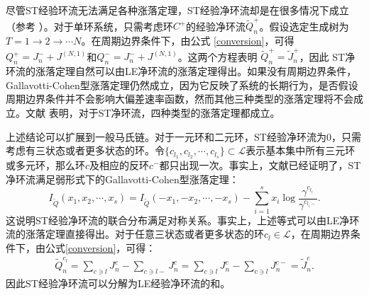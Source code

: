 尽管ST经验环流无法满足各种涨落定理，ST经验净环流却是在很多情况下成立（参考 \cite{andrieux2007fluctuation}）。对于单环系统，只需考虑环$C^+$的经验净环流$\tilde{Q}^+_n$。假设选定生成树为$T = 1 \rightarrow 2 \rightarrow \cdots N$。在周期边界条件下，由公式 \ref{conversion}，可得$Q_n^+=J_n^- + J^{(N,1)}$和$Q_n^-=J_n^- + J^{(N,1)}$。这两个方程表明 $\tilde{Q}_n^+ = \tilde{J}_n^+$，因此 ST净环流的涨落定理自然可以由LE净环流的涨落定理得出。如果没有周期边界条件，Gallavotti-Cohen型涨落定理仍然成立，因为它反映了系统的长期行为，是否假设周期边界条件并不会影响大偏差速率函数，然而其他三种类型的涨落定理将不会成立。文献\cite{polettini2014transient} 表明，对于ST净环流，四种类型的涨落定理都成立。

上述结论可以扩展到一般马氏链。对于一元环和二元环，ST经验净环流为0，只需考虑有三状态或者更多状态的环。令$\{c_{l_1}, c_{l_2},\cdots, c_{l_s}\} \subset \mathcal{L}$表示基本集中所有三元环或多元环，那么环$c$及相应的反环$c^-$都只出现一次。事实上，文献\cite{andrieux2007fluctuation}已经证明了，ST净环流满足弱形式下的Gallavotti-Cohen型涨落定理：
\begin{equation} \label{Gallavotti}
    I_{\tilde{Q}}(x_1,x_2,\cdots,x_s)
    = I_{\tilde{Q}}(-x_1,-x_2,\cdots,-x_s)
    -\sum_{i=1}^s x_i\log\frac{\gamma^{c_{l_i}}}{\gamma^{c_{l_{i}-}}}.
\end{equation}
这说明ST经验净环流的联合分布满足对称关系。事实上，上述等式可以由LE净环流的涨落定理直接得出。对于任意三状态或者更多状态的环$c_l \in \mathcal{L}$，在周期边界条件下，由公式\ref{conversion}，可得：
\begin{equation*}\label{circulation}
    \begin{split}
    \tilde{Q}^{c_l}_n =\sum_{c\ni l}J^c_n-\sum_{c\ni l-}J^c_n
    =\sum_{c\ni l}J^c_n-\sum_{c\ni l}J^{c-}_n = \tilde{J}^c_n.
    \end{split}
\end{equation*}
因此ST经验净环流可以分解为LE经验净环流的和。

